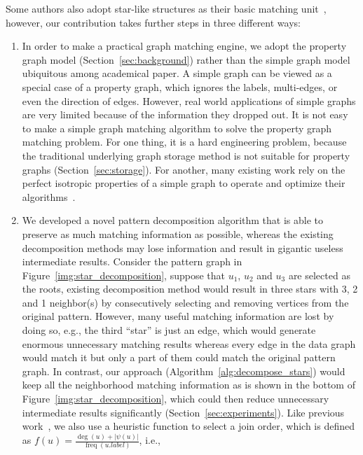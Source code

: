 Some authors also adopt star-like structures as their basic matching unit~\cite{DBLP:journals/pvldb/SunWWSL12,DBLP:journals/pvldb/LaiQLC15},
however, our contribution takes further steps in three different ways:
\begin{enumerate}[noitemsep,leftmargin=*]
\item In order to make a practical graph matching engine, we adopt the property graph model (Section~\ref{sec:background}) rather than the simple graph model ubiquitous among academical paper.
  A simple graph can be viewed as a special case of a property graph,
  which ignores the labels, multi-edges, or even the direction of edges.
  However, real world applications of simple graphs are very limited because of the information they dropped out.
  It is not easy to make a simple graph matching algorithm to solve the property graph matching problem.
  For one thing, it is a hard engineering problem, because the traditional underlying graph storage method is not suitable for property graphs (Section~\ref{sec:storage}).
  For another, many existing work rely on the perfect isotropic properties of a simple graph to operate and optimize their algorithms~\cite{DBLP:journals/pvldb/SunWWSL12,DBLP:conf/sigmod/HanLL13,DBLP:journals/pvldb/QiaoZC17}.
\item We developed a novel pattern decomposition algorithm that is able to preserve as much matching information as possible, whereas the existing decomposition methods may lose information and result in gigantic useless intermediate results.
  Consider the pattern graph in Figure~\ref{img:star_decomposition},
  suppose that $u_1$, $u_2$ and $u_3$ are selected as the roots,
  existing decomposition method would result in three stars with 3, 2 and 1 neighbor\@(s)
  by consecutively selecting and removing vertices from the original pattern.
  However, many useful matching information are lost by doing so,
  e.g., the third ``star'' is just an edge, which would generate enormous unnecessary matching results whereas every edge in the data graph would match it but only a part of them could match the original pattern graph.
  In contrast, our approach (Algorithm~\ref{alg:decompose_stars}) would keep all the neighborhood matching information as is shown in the bottom of Figure~\ref{img:star_decomposition}, which could then reduce unnecessary intermediate results significantly (Section~\ref{sec:experiments}).
  Like previous work~\cite{DBLP:journals/pvldb/SunWWSL12}, we also use a heuristic function to select a join order, which is defined as $ f(u) = \frac{\deg(u) + |\psi(u)|}{\operatorname{freq}(u.label)} $, i.e.,

\end{enumerate}
